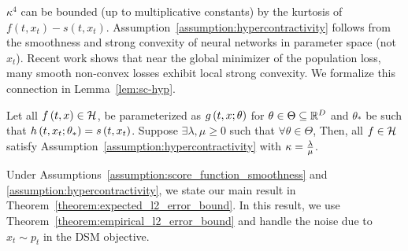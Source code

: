 $\kappa^4$ can be bounded (up to multiplicative constants) by the kurtosis of $f(t,x_t) - s(t,x_t)$. Assumption~\ref{assumption:hypercontractivity} follows from the smoothness and strong convexity of neural networks in parameter space (not \(x_t\)). Recent work \cite{milne2019piecewise, yi2022characterization} shows that near the global minimizer of the population loss, many smooth non-convex losses exhibit local strong convexity. We formalize this connection in Lemma~\ref{lem:sc-hyp}.


\begin{lemma}\label{lem:sc-hyp}
    Let all $f\left(t, x\right) \in \mathcal{H}$, be parameterized as $g\left(t, x;\theta\right)$ for $\theta \in \Theta \subseteq \mathbb{R}^D$ and $\theta_{*}$ be such that $h\left(t, x_{t}; \theta_{*}\right) = s\left(t, x_{t}\right)$. Suppose $\exists \lambda,\mu \geq 0$ such that $\forall \theta \in \Theta$, 
Then, all $f \in \mathcal{H}$ satisfy Assumption~\ref{assumption:hypercontractivity} with $\kappa = \frac{\lambda}{\mu}$.
\end{lemma}


Under Assumptions~\ref{assumption:score_function_smoothness} and \ref{assumption:hypercontractivity}, we state our main result in Theorem~\ref{theorem:expected_l2_error_bound}. In this result, we use Theorem~\ref{theorem:empirical_l2_error_bound} and handle the noise due to $x_{t} \sim p_{t}$ in the DSM objective. 

